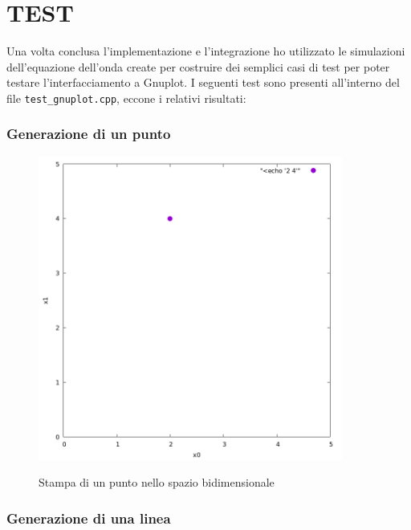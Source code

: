 \documentclass{article}
\begin{document}
\section{TEST}
Una volta conclusa l'implementazione e l'integrazione ho utilizzato le simulazioni dell'equazione dell'onda create per costruire dei semplici casi di test per poter testare l'interfacciamento a Gnuplot. I seguenti test sono presenti all'interno del file \verb|test_gnuplot.cpp|, eccone i relativi risultati:

\subsubsection{Generazione di un punto}
\begin{figure}[H] 
\begin{center}  
  \includegraphics[width=10cm]{test-gnuplot-point2d.png}\\ 
  \caption{Stampa di un punto nello spazio bidimensionale} 
\end{center} 
\end{figure}

\subsubsection{Generazione di una linea}
\end{document}

